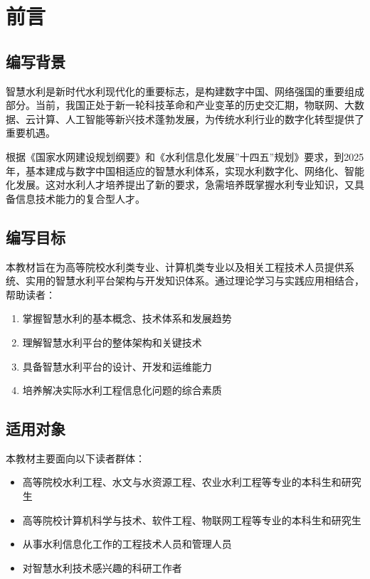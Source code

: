 \documentclass[12pt,a4paper]{ctexart}
\providecommand{\tightlist}{%
  \setlength{\itemsep}{0pt}\setlength{\parskip}{0pt}}
\begin{document}
\section{前言}\label{ux524dux8a00}

\subsection{编写背景}\label{ux7f16ux5199ux80ccux666f}

智慧水利是新时代水利现代化的重要标志，是构建数字中国、网络强国的重要组成部分。当前，我国正处于新一轮科技革命和产业变革的历史交汇期，物联网、大数据、云计算、人工智能等新兴技术蓬勃发展，为传统水利行业的数字化转型提供了重要机遇。

根据《国家水网建设规划纲要》和《水利信息化发展''十四五''规划》要求，到2025年，基本建成与数字中国相适应的智慧水利体系，实现水利数字化、网络化、智能化发展。这对水利人才培养提出了新的要求，急需培养既掌握水利专业知识，又具备信息技术能力的复合型人才。

\subsection{编写目标}\label{ux7f16ux5199ux76eeux6807}

本教材旨在为高等院校水利类专业、计算机类专业以及相关工程技术人员提供系统、实用的智慧水利平台架构与开发知识体系。通过理论学习与实践应用相结合，帮助读者：

\begin{enumerate}
\def\labelenumi{\arabic{enumi}.}
\tightlist
\item
  掌握智慧水利的基本概念、技术体系和发展趋势
\item
  理解智慧水利平台的整体架构和关键技术
\item
  具备智慧水利平台的设计、开发和运维能力
\item
  培养解决实际水利工程信息化问题的综合素质
\end{enumerate}

\subsection{适用对象}\label{ux9002ux7528ux5bf9ux8c61}

本教材主要面向以下读者群体：

\begin{itemize}
\tightlist
\item
  高等院校水利工程、水文与水资源工程、农业水利工程等专业的本科生和研究生
\item
  高等院校计算机科学与技术、软件工程、物联网工程等专业的本科生和研究生
\item
  从事水利信息化工作的工程技术人员和管理人员
\item
  对智慧水利技术感兴趣的科研工作者
\end{itemize}
\end{document}

